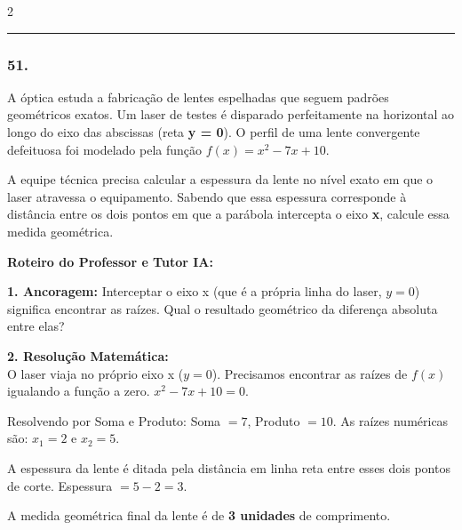 \begin{multicols*}{2}
\par\vspace{\espacoQuestao}

\noindent\textcolor{CorLinha}{\rule{\linewidth}{0.5pt}} 
\par\vspace{\espacoPreQuestao}
\subsubsection*{51.} 
\begin{enunciadoLiteral}
A óptica estuda a fabricação de lentes espelhadas que seguem padrões geométricos exatos. Um laser de testes é disparado perfeitamente na horizontal ao longo do eixo das abscissas (reta \textbf{y = 0}). O perfil de uma lente convergente defeituosa foi modelado pela função $f(x) = x^2 - 7x + 10$.

A equipe técnica precisa calcular a espessura da lente no nível exato em que o laser atravessa o equipamento. Sabendo que essa espessura corresponde à distância entre os dois pontos em que a parábola intercepta o eixo \textbf{x}, calcule essa medida geométrica.
\end{enunciadoLiteral}

\ifgabarito
    \begin{tcolorbox}[colback=CorTitUm!5, colframe=CorTitUm, boxrule=1pt, arc=4pt, left=6pt, right=6pt, top=6pt, bottom=6pt]
    \small\textbf{\textcolor{CorTitUm}{Roteiro do Professor e Tutor IA:}}\par\vspace{0.1cm}
    \color{CinzaEscuro}
    \textbf{1. Ancoragem:} Interceptar o eixo x (que é a própria linha do laser, $y=0$) significa encontrar as raízes. Qual o resultado geométrico da diferença absoluta entre elas?\par\vspace{0.1cm}
    \textbf{2. Resolução Matemática:}\\
    O laser viaja no próprio eixo x ($y=0$). Precisamos encontrar as raízes de $f(x)$ igualando a função a zero.
    $x^2 - 7x + 10 = 0$.
    
    Resolvendo por Soma e Produto:
    Soma $= 7$, Produto $= 10$. 
    As raízes numéricas são: $x_1 = 2$ e $x_2 = 5$.
    
    A espessura da lente é ditada pela distância em linha reta entre esses dois pontos de corte.
    Espessura $= 5 - 2 = 3$.
    
    A medida geométrica final da lente é de \textbf{3 unidades} de comprimento.
    \end{tcolorbox}
    \vspace{0.15cm}
    

\end{multicols*}
